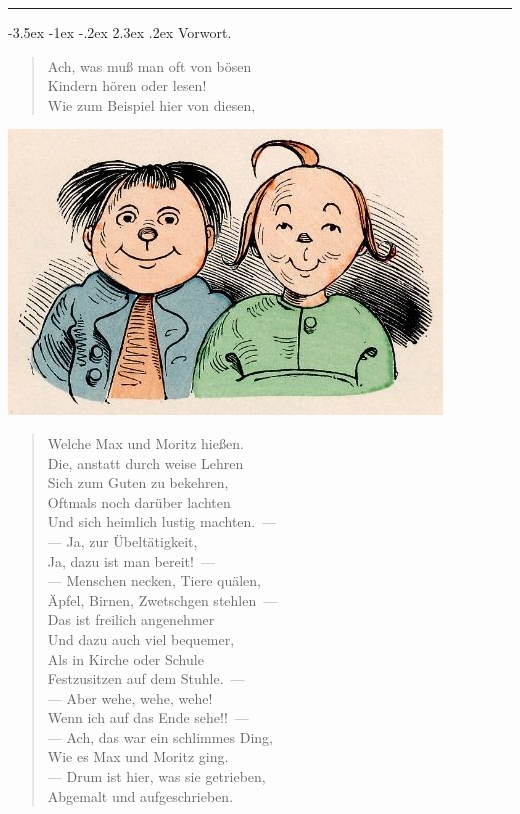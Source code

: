 \documentclass[a4paper,12pt]{article}
\makeatletter
\renewcommand\section{\@startsection {section}{1}{\z@}%
                                   {-3.5ex \@plus -1ex \@minus -.2ex}%
                                   {2.3ex \@plus.2ex}%
                                   {\centering\normalfont\LARGE\bfseries}}
\makeatother
\begin{document}
\clearpage
\tableofcontents


\bigskip
\hrule

\clearpage
\section{Vorwort.\label{Vorwort}}


\begin{verse}
Ach, was muß man oft von bösen\\{}
Kindern hören oder lesen!\\{}
Wie zum Beispiel hier von diesen,
\end{verse}



\begin{center}\includegraphics[scale=.7, alt={Max und Moritz}]{images/0-01.jpg}\end{center}



\begin{verse}
Welche Max und Moritz hießen.\\{}
Die, anstatt durch weise Lehren\\{}
Sich zum Guten zu bekehren,\\{}
Oftmals noch darüber lachten\\{}
Und sich heimlich lustig machten.~—\\{}
— Ja, zur Übeltätigkeit,\\{}
Ja, dazu ist man bereit!~—\\{}
— Menschen necken, Tiere quälen,\\{}
Äpfel, Birnen, Zwetschgen stehlen~—\\{}
Das ist freilich angenehmer\\{}
Und dazu auch viel bequemer,\\{}
Als in Kirche oder Schule\\{}
Festzusitzen auf dem Stuhle.~—\\{}
— Aber wehe, wehe, wehe!\\{}
Wenn ich auf das Ende sehe!!~—\\{}
— Ach, das war ein schlimmes Ding,\\{}
Wie es Max und Moritz ging.\\{}
— Drum ist hier, was sie getrieben,\\{}
Abgemalt und aufgeschrieben.
\end{verse}
\end{document}
